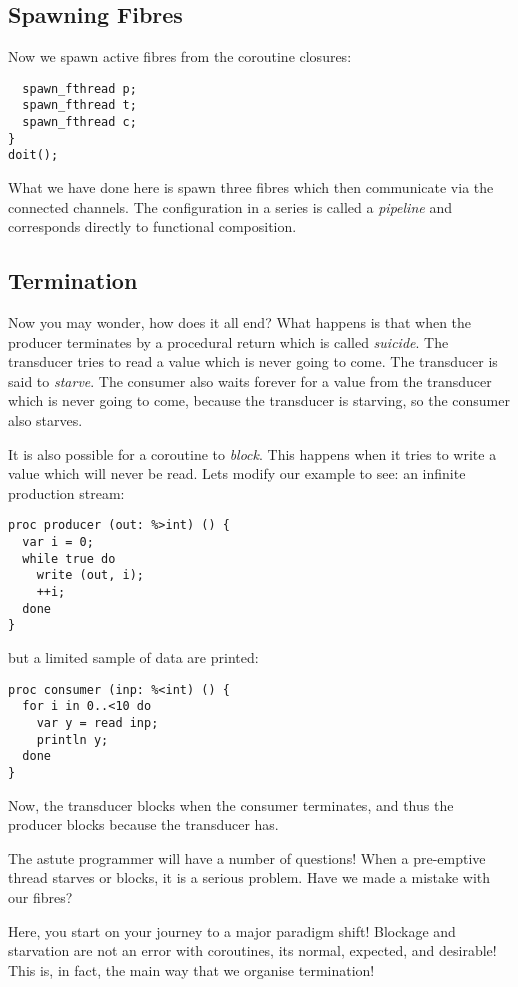 \documentclass[oneside]{book}
\begin{document}
\subsection{Spawning Fibres}
Now we spawn active fibres from the coroutine closures:

\begin{verbatim}
  spawn_fthread p;
  spawn_fthread t;
  spawn_fthread c;
}
doit();
\end{verbatim}

What we have done here is spawn three fibres which then communicate
via the connected channels. The configuration in a series is called
a {\em pipeline} and corresponds directly to functional composition.

\subsection{Termination}
Now you may wonder, how does it all end? What happens is that
when the producer terminates by a procedural return which is
called {\em suicide}. The transducer tries to read a value
which is never going to come. The transducer is said to {\em starve}.
The consumer also waits forever for a value from the transducer
which is never going to come, because the transducer is starving,
so the consumer also starves.

It is also possible for a coroutine to {\em block}. This happens when
it tries to write a value which will never be read. Lets modify
our example to see: an infinite production stream:

\begin{verbatim}
proc producer (out: %>int) () {
  var i = 0;
  while true do
    write (out, i);
    ++i;
  done
}
\end{verbatim}

but a limited sample of data are printed:

\begin{verbatim}
proc consumer (inp: %<int) () {
  for i in 0..<10 do
    var y = read inp;
    println y;
  done
}
\end{verbatim}

Now, the transducer blocks when the consumer terminates, and thus
the producer blocks because the transducer has.

The astute programmer will have a number of questions!
When a pre-emptive thread starves or blocks, it is a serious
problem. Have we made a mistake with our fibres?

Here, you start on your journey to a major paradigm shift!
Blockage and starvation are not an error with coroutines,
its normal, expected, and desirable! This is, in fact,
the main way that we organise termination!
\end{document}
